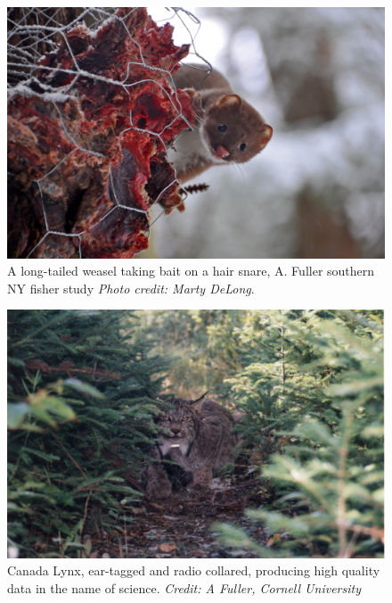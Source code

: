 \begin{figure}[h!]
\centering
\includegraphics[width=\textwidth]{Ch20-Last/weasel.jpg}
\caption{
A long-tailed weasel taking bait on a hair snare, A. Fuller southern NY fisher study
{\it Photo credit: Marty DeLong}.
}
\label{last.fig.weasels}
\end{figure}



\begin{figure}[h!]
\centering
\includegraphics[width=\textwidth]{Ch20-Last/lynx.jpg}
\caption{
Canada Lynx, ear-tagged and radio collared, producing high quality
data in the name of science.
{\it Credit: A Fuller, Cornell University} }
\label{last.fig.lynx}
\end{figure}

